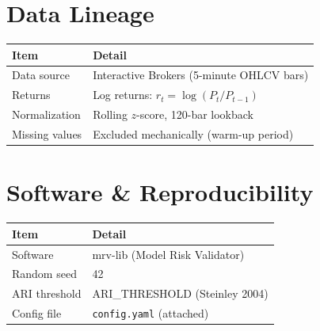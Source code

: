 \documentclass[11pt,a4paper]{article}
\begin{document}
\newpage
\appendix

\section{Data Lineage}

\begin{table}[H]
\centering
\begin{tabularx}{\textwidth}{l X}
\toprule
\textbf{Item} & \textbf{Detail} \\
\midrule
Data source     & Interactive Brokers (5-minute OHLCV bars) \\
Returns         & Log returns: $r_t = \log(P_t / P_{t-1})$ \\
Normalization   & Rolling $z$-score, 120-bar lookback \\
Missing values  & Excluded mechanically (warm-up period) \\
\bottomrule
\end{tabularx}
\end{table}

\section{Software \& Reproducibility}

\begin{table}[H]
\centering
\begin{tabularx}{\textwidth}{l X}
\toprule
\textbf{Item} & \textbf{Detail} \\
\midrule
Software        & mrv-lib (Model Risk Validator) \\
Random seed     & 42 \\
ARI threshold   & {{ARI_THRESHOLD}} (Steinley 2004) \\
Config file     & \texttt{config.yaml} (attached) \\
\bottomrule
\end{tabularx}
\end{table}
\end{document}

